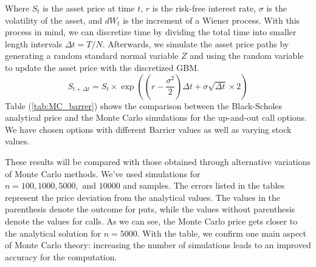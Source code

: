 Where $S_t$ is the asset price at time $t$, $r$ is the risk-free interest rate, $\sigma$ is the volatility of the asset, and $dW_t$ is the increment of a Wiener process. With this process in mind, we can discretize time by dividing the total time into smaller length intervals $\Delta t=T/N.$ Afterwards, we simulate the asset price paths by generating a random standard normal variable $Z$ and using the random variable to update the asset price with the discretized GBM.
\begin{equation}
	S_{t+\Delta t}=S_t\times\exp\left(\left(r-\frac{\sigma^2}{2}\right)\Delta t+\sigma\sqrt{\Delta t}\times 2\right)
\end{equation}
Table (\ref{tab:MC_barrer}) shows the comparison between the Black-Scholes analytical price and the Monte Carlo simulations for the up-and-out call options. We have chosen options with different Barrier values as well as varying stock values.

These results will be compared with those obtained through alternative variations of Monte Carlo methods. We've used simulations for $n=100,1000,5000,\text{ and }10000$ and samples. The errors listed in the tables represent the price deviation from the analytical values. The values in the parenthesis denote the outcome for puts, while the values without parenthesis denote the values for calls. As we can see, the Monte Carlo price gets closer to the analytical solution for $n=5000$. With the table, we confirm one main aspect of Monte Carlo theory: increasing the number of simulations leads to an improved accuracy for the computation.
